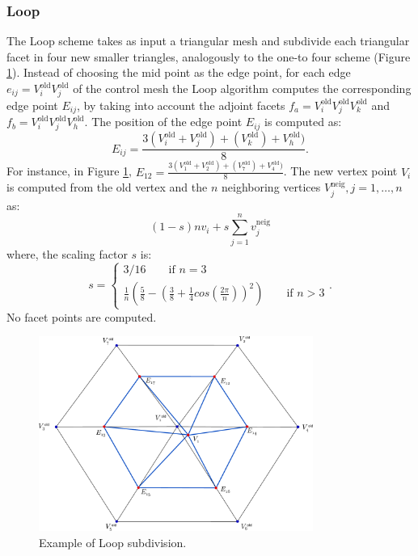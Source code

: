 \subsubsection{Loop}
The Loop scheme takes as input a triangular mesh and subdivide each triangular facet in four new smaller triangles, analogously to the one-to four scheme (Figure \ref{fig:subdivisionLoop}).
Instead of choosing the mid point as the edge point, for each edge  $e_{ij} = V_i^{\text{old}}V_j^{\text{old}}$ of the control mesh the Loop algorithm computes the corresponding edge point $E_{ij}$, by taking into account the adjoint facets $f_{a} = V_i^{\text{old}}V_j^{\text{old}}V_k^{\text{old}}$ and $f_{b} = V_i^{\text{old}}V_j^{\text{old}}V_h^{\text{old}}$. The position of the edge point $E_{ij}$ is computed as:
\[
E_{ij} = \frac{3(V_i^{\text{old}} + V_j^{\text{old}}) + (V_k^{\text{old}}) + V_h^{\text{old}}) }{8}.
\]
For instance, in Figure \ref{fig:subdivisionLoop}, $E_{12} = \frac{3(V_1^{\text{old}} + V_2^{\text{old}}) + (V_7^{\text{old}}) + V_4^{\text{old}}) }{8}$.
The new vertex point $V_i$ is computed from the old vertex and the $n$ neighboring vertices $V_j^{\text{neig}}, j = 1,\dots, n$ as:
\[
(1-s) n v_i + s \sum_{j=1}^n v_j^{\text{neig}}
\]
where, the scaling factor $s$ is:
\[
s=
\begin{cases}
  3/16 \qquad \text{if $n = 3$}\\
  \frac{1}{n} \left(\frac{5}{8} - \left(\frac{3}{8} + \frac{1}{4} cos\left(\frac{2\pi}{n}\right)\right)^2\right) \qquad \text{if $n > 3$}
\end{cases}
.
\]
No facet points are computed.

\begin{figure}
\begin{center}
\centering
  \includegraphics[width=0.8\textwidth]{./img/subdivisionLoop}
 \caption{Example of Loop subdivision.}
 \label{fig:subdivisionLoop}
\end{center}
\end{figure}


